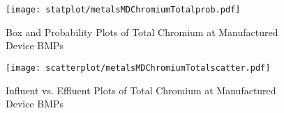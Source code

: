         \begin{figure}[hb]   %
            \centering
            \texttt{[image: statplot/metalsMDChromiumTotalprob.pdf]}
            \caption{Box and Probability Plots of Total Chromium at Manufactured Device BMPs}
        \end{figure}         %
        
        
        \begin{figure}[hb]   %
            \centering
            \texttt{[image: scatterplot/metalsMDChromiumTotalscatter.pdf]}
            \caption{Influent vs. Effluent Plots of Total Chromium at Manufactured Device BMPs}
        \end{figure}         %
        \clearpage
        